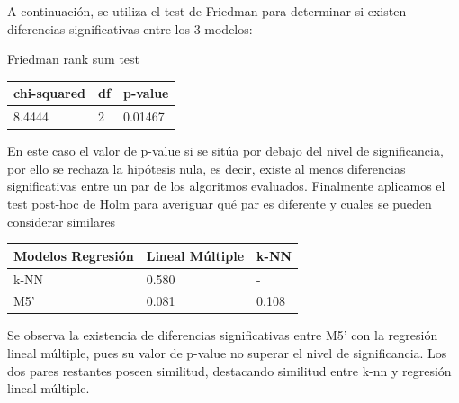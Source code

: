 A continuación, se utiliza el test de Friedman para determinar si existen diferencias significativas entre los 3 modelos:

Friedman rank sum test
\begin{table}[!h]
	\centering
	\begin{tabular}{lll}
		chi-squared & df & p-value \\ \hline
		8.4444      & 2  & 0.01467
	\end{tabular}
\end{table}

En este caso el valor de p-value si se sitúa por debajo del nivel de significancia, por ello se rechaza la hipótesis nula, es decir, existe al menos diferencias significativas entre un par de los algoritmos evaluados.
Finalmente aplicamos el test post-hoc de Holm para averiguar qué par es diferente y cuales se pueden considerar similares

\begin{table}[!h]
	\centering
	\begin{tabular}{l|ll}
		Modelos Regresión & Lineal Múltiple & k-NN  \\ \hline
		k-NN              & 0.580           & -     \\
		M5'               & 0.081           & 0.108
	\end{tabular}
\end{table}


Se observa la existencia de diferencias significativas entre M5' con la regresión lineal múltiple, pues su valor de p-value no superar el nivel de significancia. Los dos pares restantes poseen similitud, destacando similitud entre k-nn y regresión lineal múltiple.




